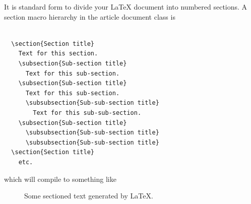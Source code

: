 It is standard form to divide your \LaTeX{} document into numbered sections. A  section macro hierarchy in the article document class is 
\begin{verbatim}

  \section{Section title}
    Text for this section.
    \subsection{Sub-section title}
      Text for this sub-section.
    \subsection{Sub-section title}
      Text for this sub-section.
      \subsubsection{Sub-sub-section title}
        Text for this sub-sub-section.
    \subsection{Sub-section title}
      \subsubsection{Sub-sub-section title}
      \subsubsection{Sub-sub-section title}
  \section{Section title}
    etc.

\end{verbatim}

which will compile to something like

\begin{figure}[htbp!]
    \centering
    \caption{Some sectioned text generated by \LaTeX{}.}
    \label{overleafNotes.fig}
\end{figure}

